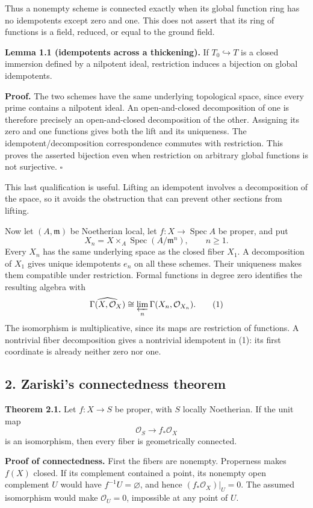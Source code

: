 \documentclass[11pt]{article}
\begin{document}
Thus a nonempty scheme is connected exactly when its global function
ring has no idempotents except zero and one. This does not assert that
its ring of functions is a field, reduced, or equal to the ground field.

\textbf{Lemma 1.1 (idempotents across a thickening).} If
\(T_0\hookrightarrow T\) is a closed immersion defined by a nilpotent
ideal, restriction induces a bijection on global idempotents.

\textbf{Proof.} The two schemes have the same underlying topological
space, since every prime contains a nilpotent ideal. An open-and-closed
decomposition of one is therefore precisely an open-and-closed
decomposition of the other. Assigning its zero and one functions gives
both the lift and its uniqueness. The idempotent/decomposition
correspondence commutes with restriction. This proves the asserted
bijection even when restriction on arbitrary global functions is not
surjective. \(\square\)

This last qualification is useful. Lifting an idempotent involves a
decomposition of the space, so it avoids the obstruction that can
prevent other sections from lifting.

Now let \((A,\mathfrak m)\) be Noetherian local, let
\(f:X\to\operatorname{Spec}A\) be proper, and put \[
X_n=X\times_A\operatorname{Spec}(A/\mathfrak m^n),\qquad n\geq1.
\] Every \(X_n\) has the same underlying space as the closed fiber
\(X_1\). A decomposition of \(X_1\) gives unique idempotents \(e_n\) on
all these schemes. Their uniqueness makes them compatible under
restriction. Formal functions in degree zero identifies the resulting
algebra with \[
\widehat{\Gamma(X,\mathcal O_X)}
\cong\varprojlim_n\Gamma(X_n,\mathcal O_{X_n}).
\tag{1}
\] The isomorphism is multiplicative, since its maps are restriction of
functions. A nontrivial fiber decomposition gives a nontrivial
idempotent in (1): its first coordinate is already neither zero nor one.

\subsection{2. Zariski's connectedness
theorem}\label{zariskis-connectedness-theorem}

\textbf{Theorem 2.1.} Let \(f:X\to S\) be proper, with \(S\) locally
Noetherian. If the unit map \[
\mathcal O_S\longrightarrow f_*\mathcal O_X
\] is an isomorphism, then every fiber is geometrically connected.

\textbf{Proof of connectedness.} First the fibers are nonempty.
Properness makes \(f(X)\) closed. If its complement contained a point,
its nonempty open complement \(U\) would have \(f^{-1}U=\varnothing\),
and hence \((f_*\mathcal O_X)|_U=0\). The assumed isomorphism would make
\(\mathcal O_U=0\), impossible at any point of \(U\).
\end{document}
